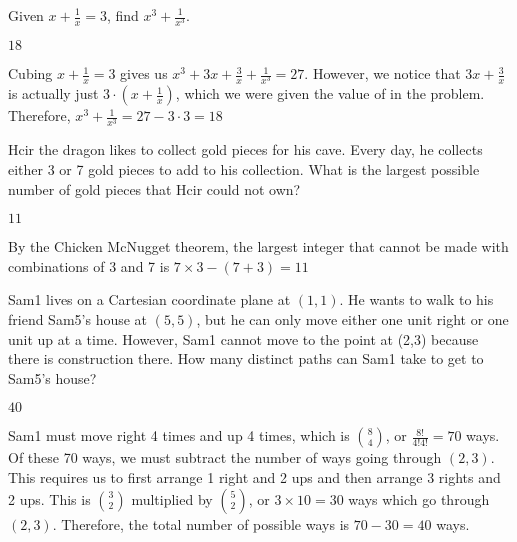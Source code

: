 \documentclass[11pt]{article}
\begin{document}
\begin{problem}
Given $x + \frac{1}{x} = 3$, find $x^3+\frac{1}{x^3}$.
\end{problem}
\begin{answer}
$\boxed{18}$
\end{answer}
\begin{solution}
Cubing $x + \frac{1}{x} = 3$ gives us $x^3+3x+\frac{3}{x}+\frac{1}{x^3} = 27$. However, we notice that $3x+\frac{3}{x}$ is actually just $3\cdot (x + \frac{1}{x})$, which we were given the value of in the problem. Therefore, $x^3+\frac{1}{x^3} = 27 - 3 \cdot 3 = \boxed{18}$
\end{solution}
\begin{problem}
Hcir the dragon likes to collect gold pieces for his cave. Every day, he collects either 3 or 7 gold pieces to add to his collection. What is the largest possible number of gold pieces that Hcir could not own?
\end{problem}
\begin{answer}
$\boxed{11}$
\end{answer}
\begin{solution}
By the Chicken McNugget theorem, the largest integer that cannot be made with combinations of 3 and 7 is $7\times3 - (7 + 3) = \boxed{11}$
\end{solution}

\begin{problem} Sam1 lives on a Cartesian coordinate plane at $(1,1)$. He wants to walk to his friend Sam5's house at $(5,5)$, but he can only move either one unit right or one unit up at a time. However, Sam1 cannot move to the point at (2,3) because there is construction there. How many distinct paths can Sam1 take to get to Sam5's house?
\end{problem}
\begin{answer}
$\boxed{40}$
\end{answer}
\begin{solution}
Sam1 must move right 4 times and up 4 times, which is $8 \choose 4$, or $\frac{8!}{4!4!} = 70$ ways. Of these 70 ways, we must subtract the number of ways going through $(2,3)$. This requires us to first arrange 1 right and 2 ups and then arrange 3 rights and 2 ups. This is $3 \choose 2$ multiplied by $5 \choose 2$, or $3 \times 10 = 30$ ways which go through $(2,3)$. Therefore, the total number of possible ways is $70-30 = \boxed{40}$ ways.
\end{solution}
\end{document}
